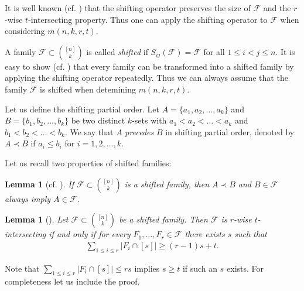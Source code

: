 \documentclass[11pt,a4paper]{article}
\newtheorem{lem}[thm]{Lemma}
\newtheorem{false statement}{False statement}
\theoremstyle{definition}
\def\hf{\mathcal{F}}
\begin{document}
It is well known (cf. \cite{F87}) that the shifting operator preserves the size of $\hf$ and the $r$-wise $t$-intersecting property. Thus one can apply the shifting operator to  $\hf$ when considering $m(n,k,r,t)$.

A family $\hf\subset \binom{[n]}{k}$ is called {\it shifted} if $S_{ij}(\hf)=\hf$ for all $1\leq i<j\leq n$. It is easy to show (cf. \cite{F87}) that every family can be transformed into a shifted family by applying the shifting operator repeatedly. Thus we can always assume that the family $\hf$ is shifted when detemining $m(n,k,r,t)$.

Let us define the shifting partial order.
Let $A=\{a_1,a_2,\ldots,a_k\}$ and $B=\{b_1,b_2,\ldots,b_k\}$ be two distinct $k$-sets with $a_1<a_2<\ldots<a_k$ and $b_1<b_2<\ldots<b_k$. We say that $A$ {\it precedes} $B$ in shifting partial order, denoted by $A\prec B$ if $a_i\leq b_i$ for $i=1,2,\ldots,k$.

Let us recall two properties of shifted families:

\begin{lem}[cf. \cite{F87}]
If $\hf\subset \binom{[n]}{k}$ is a shifted family, then $A\prec B$ and $B\in \hf$ always imply $A\in \hf$.
\end{lem}


\begin{lem}[\cite{F87}]\label{lem-2.4}
Let $\hf\subset  \binom{[n]}{k}$ be a shifted family. Then $\hf$ is $r$-wise $t$-intersecting if and only if
for every $F_1,\ldots,F_r\in \hf$ there exists $s$ such that
\begin{align}\label{ineq-2.5}
\sum_{1\leq i\leq r} |F_i\cap [s]| \geq (r-1) s+t.
\end{align}
\end{lem}

Note that $\sum\limits_{1\leq i\leq r} |F_i\cap [s]|\leq rs$ implies $s\geq t$ if such an $s$ exists.  For completeness let us include the proof.
\end{document}
